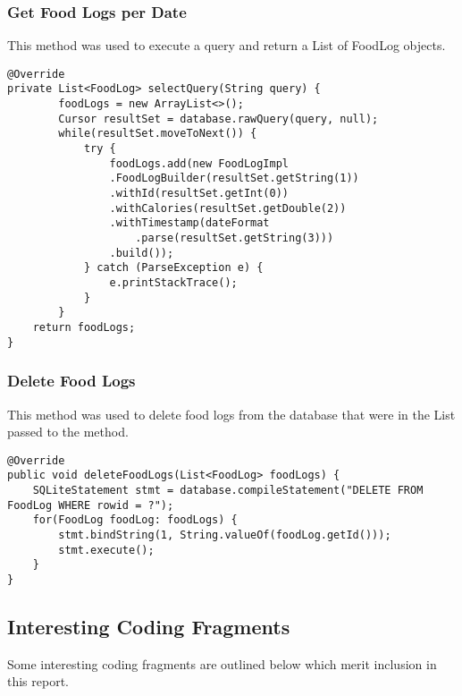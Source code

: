 \subsubsection*{Get Food Logs per Date}
This method was used to execute a query and return a List of FoodLog objects.
\begin{lstlisting}[style=Java]
@Override
private List<FoodLog> selectQuery(String query) {
        foodLogs = new ArrayList<>();
        Cursor resultSet = database.rawQuery(query, null);
        while(resultSet.moveToNext()) {
            try {
                foodLogs.add(new FoodLogImpl
                .FoodLogBuilder(resultSet.getString(1))
                .withId(resultSet.getInt(0))
                .withCalories(resultSet.getDouble(2))
                .withTimestamp(dateFormat
                    .parse(resultSet.getString(3)))
                .build());
            } catch (ParseException e) {
                e.printStackTrace();
            }
        }
    return foodLogs;
}
\end{lstlisting}

\subsubsection*{Delete Food Logs}
This method was used to delete food logs from the database that were in the List passed to the method.
\begin{lstlisting}[style=Java]
@Override
public void deleteFoodLogs(List<FoodLog> foodLogs) {
    SQLiteStatement stmt = database.compileStatement("DELETE FROM FoodLog WHERE rowid = ?");
    for(FoodLog foodLog: foodLogs) {
        stmt.bindString(1, String.valueOf(foodLog.getId()));
        stmt.execute();
    }
}
\end{lstlisting}

\subsection*{Interesting Coding Fragments}
Some interesting coding fragments are outlined below which merit inclusion in this report.

